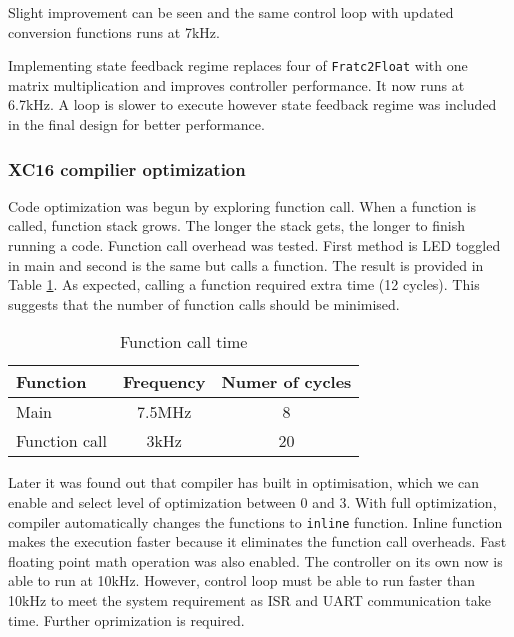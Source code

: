 Slight improvement can be seen and the same control loop with updated conversion functions runs at 7kHz.

Implementing state feedback regime replaces four of \texttt{Fratc2Float} with one matrix multiplication and improves controller performance. It now runs at 6.7kHz. A loop is slower to execute however state feedback regime was included in the final design for better performance. 


\subsubsection{XC16 compilier optimization}
Code optimization was begun by exploring function call. When a function is called, function stack grows. The longer the stack gets, the longer to finish running a code. Function call overhead was tested. First method is LED toggled in main and second is the same but calls a function. The result is provided in Table \ref{tab:stack}. As expected, calling a function required extra time (12 cycles). This suggests that the number of function calls should be minimised. 

\begin{table}[h]
\centering
\begin{tabular}{|p{4cm} | c | c|}
\hline
Function        & Frequency & Numer of cycles\\ \hline \hline
Main            & 7.5MHz    & 8\\ \hline
Function call   & 3kHz      & 20\\ \hline
\end{tabular}
\caption{Function call time}
\label{tab:stack}
\end{table}

Later it was found out that compiler has built in optimisation, which we can enable and select level of optimization between 0 and 3. With full optimization, compiler automatically changes the functions to \texttt{inline} function. Inline function makes the execution faster because it eliminates the function call overheads. Fast floating point math operation was also enabled. The controller on its own now is able to run at 10kHz. However, control loop must be able to run faster than 10kHz to meet the system requirement as ISR and UART communication take time. Further oprimization is required.